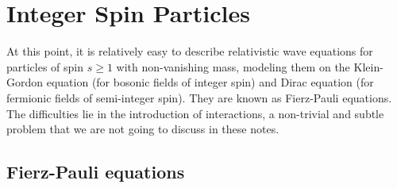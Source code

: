 \section{Integer Spin Particles}

At this point, it is relatively easy to describe relativistic wave equations for particles of spin \(s \geq 1\) with non-vanishing mass, modeling them on the Klein-Gordon equation (for bosonic fields of integer spin) and Dirac equation (for fermionic fields of semi-integer spin). They are known as Fierz-Pauli equations. The difficulties lie in the introduction of interactions, a non-trivial and subtle problem that we are not going to discuss in these notes.

\subsection{Fierz-Pauli equations}

